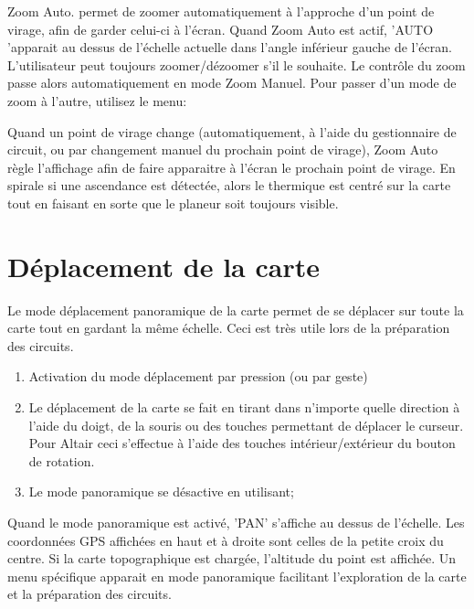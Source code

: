 Zoom Auto. permet de zoomer automatiquement à l'approche d'un point de virage, afin de garder celui-ci à l'écran.  Quand Zoom Auto est actif, 'AUTO 'apparait au dessus de l'échelle actuelle dans l'angle inférieur gauche de l'écran. L'utilisateur peut toujours zoomer/dézoomer s'il le souhaite. Le contrôle du zoom passe alors automatiquement en mode Zoom Manuel.
Pour passer d'un mode de zoom à l'autre, utilisez le menu:
\begin{quote}
\blink{} 
\end{quote}
Quand un point de virage change (automatiquement, à l'aide du gestionnaire de circuit, ou par changement manuel du prochain point de virage), Zoom Auto règle l'affichage afin de faire apparaitre à l'écran le prochain point de virage.
En spirale si une ascendance est détectée, alors le thermique est centré sur la carte tout en faisant en sorte que le planeur soit toujours visible.

\section{Déplacement de la carte}\label{sec:panning}
Le mode déplacement panoramique de la carte permet de se déplacer sur toute la carte tout en gardant la même échelle. Ceci est très utile lors de la préparation des circuits.
\begin{enumerate}
\item Activation du mode déplacement par pression (ou par geste)  
\begin{quote}
\blink{}
\end{quote}

\item Le déplacement de la carte se fait en tirant dans n'importe quelle direction à l'aide du doigt, de la souris ou des touches permettant de déplacer le curseur. Pour Altair ceci s'effectue à l'aide des  touches intérieur/extérieur du bouton de rotation.
\item Le mode panoramique se désactive en utilisant;
\begin{quote}
\end{quote}
\end{enumerate} 

Quand le mode panoramique est activé, 'PAN' s'affiche au dessus de l'échelle. Les coordonnées GPS affichées en haut et à droite sont celles de la petite croix du centre. Si la carte topographique est chargée, l'altitude du point est affichée.
Un menu spécifique apparait en mode panoramique facilitant l'exploration de la carte et la préparation des circuits.

